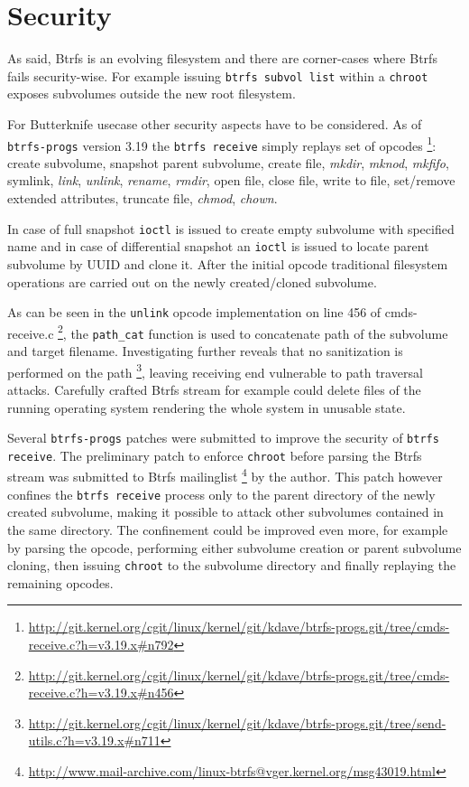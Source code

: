\documentclass[a4paper,11pt]{kth-mag}
\begin{document}
\section{Security}
As said, Btrfs is an evolving filesystem and there
are corner-cases where Btrfs fails security-wise.
For example issuing \texttt{btrfs subvol list} within
a \texttt{chroot} exposes subvolumes outside the new root filesystem.


For Butterknife usecase other security aspects have to be considered.
As of \texttt{btrfs-progs} version 3.19 the \texttt{btrfs receive}
simply replays set of opcodes
\footnote{\url{http://git.kernel.org/cgit/linux/kernel/git/kdave/btrfs-progs.git/tree/cmds-receive.c?h=v3.19.x\#n792}}:
create subvolume, snapshot parent subvolume,
create file, \emph{mkdir}, \emph{mknod}, \emph{mkfifo}, symlink,
\emph{link}, \emph{unlink}, \emph{rename}, \emph{rmdir}, open file,
close file, write to file, set/remove extended attributes,
truncate file, \emph{chmod}, \emph{chown}.

In case of full snapshot \texttt{ioctl} is issued to
create empty subvolume with specified name and
in case of differential snapshot an \texttt{ioctl} is issued
to locate parent subvolume by UUID and clone it.
After the initial opcode traditional filesystem
operations are carried out on the newly
created/cloned subvolume.

As can be seen in the \texttt{unlink} opcode
implementation on line 456 of cmds-receive.c
\footnote{\url{http://git.kernel.org/cgit/linux/kernel/git/kdave/btrfs-progs.git/tree/cmds-receive.c?h=v3.19.x\#n456}},
the \texttt{path\_cat} function is used to concatenate
path of the subvolume and target filename.
Investigating further reveals that no sanitization is performed on the path
\footnote{\url{http://git.kernel.org/cgit/linux/kernel/git/kdave/btrfs-progs.git/tree/send-utils.c?h=v3.19.x\#n711}}, leaving receiving end vulnerable to path traversal attacks.
Carefully crafted Btrfs stream for example could delete files
of the running operating system rendering the whole system
in unusable state.

Several \texttt{btrfs-progs} patches were submitted to improve
the security of \texttt{btrfs receive}.
The preliminary patch to enforce \texttt{chroot}
before parsing the Btrfs stream was submitted to Btrfs mailinglist
\footnote{\url{http://www.mail-archive.com/linux-btrfs@vger.kernel.org/msg43019.html}}
by the author.
This patch however confines the \texttt{btrfs receive}
process only to the parent directory of the newly created subvolume,
making it possible to attack other subvolumes contained in the same directory.
The confinement could be improved even more, for example
by parsing the opcode, performing either
subvolume creation or parent subvolume cloning,
then issuing \texttt{chroot} to the subvolume directory
and finally replaying the remaining opcodes.
\end{document}
